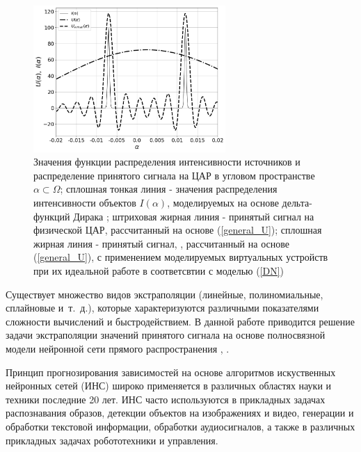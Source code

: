 \documentclass{article}
\begin{document}
		\begin{figure}[h]
		\centering
		\includegraphics[width=0.65\textwidth]{Begin_target_bw.png}
		\caption{Значения функции распределения интенсивности источников и распределение принятого сигнала на ЦАР в угловом пространстве $\alpha \subset \Omega$; сплошная тонкая линия - значения распределения интенсивности объектов $I(\alpha)$, моделируемых на основе дельта-функций Дирака \cite{lit22}; штриховая жирная линия - принятый сигнал на физической ЦАР, рассчитанный на основе (\ref{general_U}); сплошная жирная линия - принятый сигнал, , рассчитанный на основе (\ref{general_U}), с применением моделируемых виртуальных устройств при их идеальной работе в соответсвтии с моделью (\ref{DN})}
		\label{fig:2}
		\end{figure}
	
	
	
	Существует множество видов экстраполяции (линейные, полиномиальные, сплайновые и~т.~д.), которые характеризуются различными показателями сложности вычислений и быстродействием. В данной работе приводится решение задачи экстраполяции значений принятого сигнала на основе полносвязной модели нейронной сети прямого распространения \cite{lit18}, \cite{lit19}.
	
	Принцип прогнозирования зависимостей на основе алгоритмов искуственных нейронных сетей (ИНС) широко применяется в различных областях науки и техники последние 20 лет. ИНС часто используются в прикладных задачах распознавания образов, детекции объектов на изображениях и видео, генерации и обработки текстовой информации, обработки аудиосигналов, а также в различных прикладных задачах робототехники и управления.
	
\end{document}
